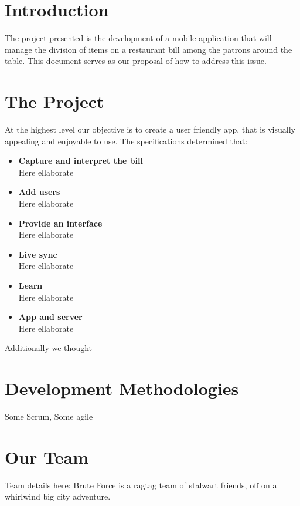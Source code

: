 \documentclass[12pt,a4paper]{article}
\begin{document}
   \section{Introduction}
   The project presented is the development of a mobile application that will manage the division of items on a restaurant bill among the patrons around the table. This document serves as our proposal of how to address this issue.

   \section{The Project}
   At the highest level our objective is to create a user friendly app, that is visually appealing and enjoyable to use. The specifications determined that:
   \begin{itemize}
      \item \textbf{Capture and interpret the bill}\\
      Here ellaborate
      \item \textbf{Add users}\\
      Here ellaborate
      \item \textbf{Provide an interface}\\
      Here ellaborate
      \item \textbf{Live sync}\\
      Here ellaborate
      \item \textbf{Learn}\\
      Here ellaborate
      \item \textbf{App and server}\\
      Here ellaborate
   \end{itemize}
   Additionally we thought

   \section{Development Methodologies}
   Some Scrum, Some agile

   \section{Our Team}
   Team details here:
   Brute Force is a ragtag team of stalwart friends, off on a whirlwind big city adventure.
\end{document}
